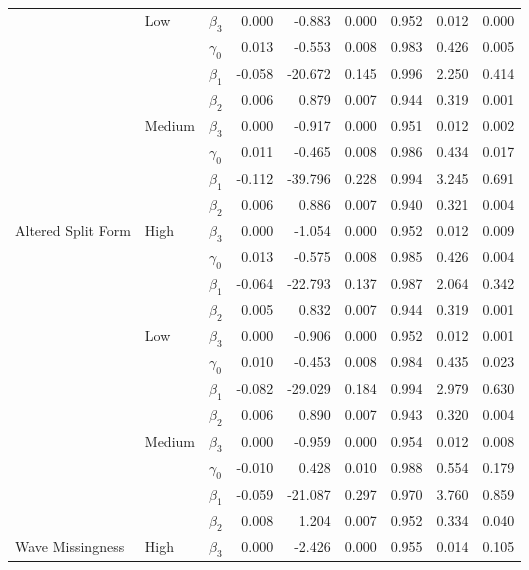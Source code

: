 \documentclass{article}\usepackage[]{graphicx}\usepackage[]{color}
\newenvironment{knitrout}{}{} %
\begin{document}
\begin{knitrout}
\begin{table}[H]
{\begin{tabular}[t]{l|l|l|r|r|r|r|r|r}
 & \multirow{-4}{*}{\raggedright\arraybackslash Low} & $\beta_3$ & 0.000 & -0.883 & 0.000 & 0.952 & 0.012 & 0.000\\
\cline{2-9}
 &  & $\gamma_0$ & 0.013 & -0.553 & 0.008 & 0.983 & 0.426 & 0.005\\
\cline{3-9}
 &  & $\beta_1$ & -0.058 & -20.672 & 0.145 & 0.996 & 2.250 & 0.414\\
\cline{3-9}
 &  & $\beta_2$ & 0.006 & 0.879 & 0.007 & 0.944 & 0.319 & 0.001\\
\cline{3-9}
 & \multirow{-4}{*}{\raggedright\arraybackslash Medium} & $\beta_3$ & 0.000 & -0.917 & 0.000 & 0.951 & 0.012 & 0.002\\
\cline{2-9}
 &  & $\gamma_0$ & 0.011 & -0.465 & 0.008 & 0.986 & 0.434 & 0.017\\
\cline{3-9}
 &  & $\beta_1$ & -0.112 & -39.796 & 0.228 & 0.994 & 3.245 & 0.691\\
\cline{3-9}
 &  & $\beta_2$ & 0.006 & 0.886 & 0.007 & 0.940 & 0.321 & 0.004\\
\cline{3-9}
\multirow{-12}{*}{\raggedright\arraybackslash Altered Split Form} & \multirow{-4}{*}{\raggedright\arraybackslash High} & $\beta_3$ & 0.000 & -1.054 & 0.000 & 0.952 & 0.012 & 0.009\\
\cline{1-9}
 &  & $\gamma_0$ & 0.013 & -0.575 & 0.008 & 0.985 & 0.426 & 0.004\\
\cline{3-9}
 &  & $\beta_1$ & -0.064 & -22.793 & 0.137 & 0.987 & 2.064 & 0.342\\
\cline{3-9}
 &  & $\beta_2$ & 0.005 & 0.832 & 0.007 & 0.944 & 0.319 & 0.001\\
\cline{3-9}
 & \multirow{-4}{*}{\raggedright\arraybackslash Low} & $\beta_3$ & 0.000 & -0.906 & 0.000 & 0.952 & 0.012 & 0.001\\
\cline{2-9}
 &  & $\gamma_0$ & 0.010 & -0.453 & 0.008 & 0.984 & 0.435 & 0.023\\
\cline{3-9}
 &  & $\beta_1$ & -0.082 & -29.029 & 0.184 & 0.994 & 2.979 & 0.630\\
\cline{3-9}
 &  & $\beta_2$ & 0.006 & 0.890 & 0.007 & 0.943 & 0.320 & 0.004\\
\cline{3-9}
 & \multirow{-4}{*}{\raggedright\arraybackslash Medium} & $\beta_3$ & 0.000 & -0.959 & 0.000 & 0.954 & 0.012 & 0.008\\
\cline{2-9}
 &  & $\gamma_0$ & -0.010 & 0.428 & 0.010 & 0.988 & 0.554 & 0.179\\
\cline{3-9}
 &  & $\beta_1$ & -0.059 & -21.087 & 0.297 & 0.970 & 3.760 & 0.859\\
\cline{3-9}
 &  & $\beta_2$ & 0.008 & 1.204 & 0.007 & 0.952 & 0.334 & 0.040\\
\cline{3-9}
\multirow{-12}{*}{\raggedright\arraybackslash Wave Missingness} & \multirow{-4}{*}{\raggedright\arraybackslash High} & $\beta_3$ & 0.000 & -2.426 & 0.000 & 0.955 & 0.014 & 0.105\\
\hline
\end{tabular}}
\end{table}


\end{knitrout}
\end{document}
